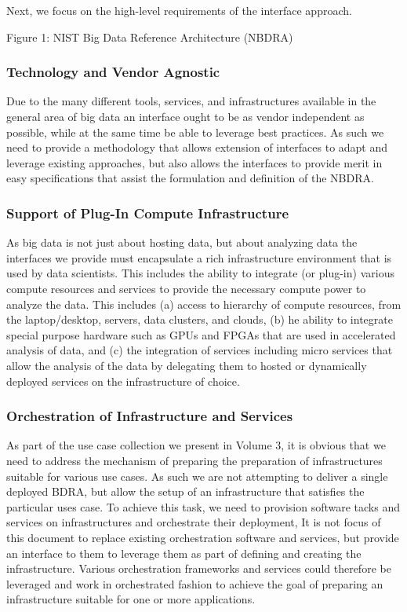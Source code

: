 \documentclass[9pt,twocolumn]{styles/osajnl}
\begin{document}
Next, we focus on the high-level requirements of the interface approach. 

Figure 1: NIST Big Data Reference Architecture (NBDRA)

\subsubsection{Technology and Vendor Agnostic}

Due to the many different tools, services, and infrastructures available in the general area of big data an interface ought to be as vendor independent as possible, while at the same time be able to leverage best practices. As such we need to provide a methodology that allows extension of interfaces to adapt and leverage existing approaches, but also allows the interfaces to provide merit in easy specifications that assist the formulation and definition of the NBDRA. 

\subsubsection{Support of Plug-In Compute Infrastructure}

As big data is not just about hosting data, but about analyzing data the interfaces we provide must encapsulate a rich infrastructure environment that is used by data scientists. This includes the ability to integrate (or plug-in) various compute resources and services to provide the necessary compute power to analyze the data. This includes (a) access to hierarchy of compute resources, from the laptop/desktop, servers, data clusters, and clouds, (b) he ability to integrate special purpose hardware such as GPUs and FPGAs that are used in accelerated analysis of data, and (c) the integration of services including micro services that allow the analysis of the data by delegating them to hosted or dynamically deployed services on the infrastructure of choice.

\subsubsection{Orchestration of Infrastructure and Services}

As part of the use case collection we present in Volume 3, it is obvious that we need to address the mechanism of preparing the preparation of infrastructures suitable for various use cases. As such we are not attempting to deliver a single deployed BDRA, but allow the setup of an infrastructure that satisfies the particular uses case. To achieve this task, we need to provision software tacks and services on infrastructures and orchestrate their deployment, It is not focus of this document to replace existing orchestration software and services, but provide an interface to them to leverage them as part of defining and creating the infrastructure. Various orchestration frameworks and services could therefore be leveraged and work in orchestrated fashion to achieve the goal of preparing an infrastructure suitable for one or more applications.
\end{document}
